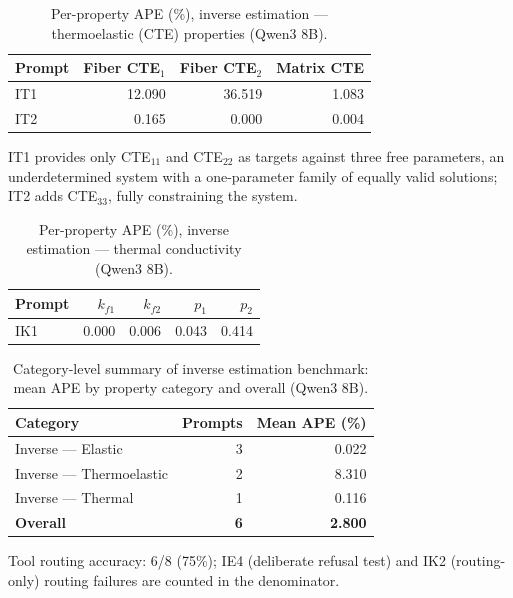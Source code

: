 \documentclass[preprint,review,10pt,number]{elsarticle}
\begin{document}
\begin{table}[htbp]
\centering
\caption{Per-property APE (\%), inverse estimation --- thermoelastic (CTE) properties (Qwen3 8B).}
\label{tab:inv_mape_thermoelastic_8b}
\begin{tabular}{lrrr}
\toprule
\textbf{Prompt} & Fiber CTE$_1$ & Fiber CTE$_2$ & Matrix CTE \\
\midrule
IT1 & 12.090 & 36.519 & 1.083 \\
IT2 & 0.165  & 0.000  & 0.004 \\
\bottomrule
\end{tabular}

\vspace{4pt}
\footnotesize IT1 provides only CTE$_{11}$ and CTE$_{22}$ as targets against three free parameters, an underdetermined system with a one-parameter family of equally valid solutions; IT2 adds CTE$_{33}$, fully constraining the system.
\end{table}

\begin{table}[htbp]
\centering
\caption{Per-property APE (\%), inverse estimation --- thermal conductivity (Qwen3 8B).}
\label{tab:inv_mape_thermal_8b}
\begin{tabular}{lrrrr}
\toprule
\textbf{Prompt} & $k_{f1}$ & $k_{f2}$ & $p_1$ & $p_2$ \\
\midrule
IK1 & 0.000 & 0.006 & 0.043 & 0.414 \\
\bottomrule
\end{tabular}
\end{table}

\begin{table}[htbp]
\centering
\caption{Category-level summary of inverse estimation benchmark: mean APE by property category and overall (Qwen3 8B).}
\label{tab:inverse_summary_8b}
\begin{tabular}{lrr}
\toprule
\textbf{Category} & \textbf{Prompts} & \textbf{Mean APE (\%)} \\
\midrule
Inverse --- Elastic       & 3 & 0.022 \\
Inverse --- Thermoelastic & 2 & 8.310 \\
Inverse --- Thermal       & 1 & 0.116 \\
\midrule
\textbf{Overall}          & \textbf{6} & \textbf{2.800} \\
\bottomrule
\end{tabular}

\vspace{4pt}
\footnotesize Tool routing accuracy: 6/8 (75\%); IE4 (deliberate refusal test) and IK2 (routing-only) routing failures are counted in the denominator.
\end{table}
\end{document}
